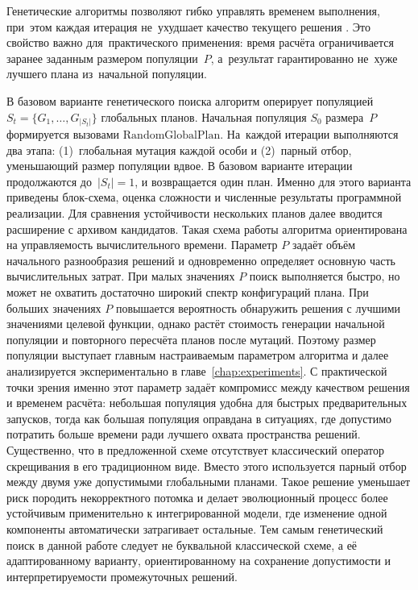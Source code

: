 Генетические алгоритмы позволяют гибко управлять временем выполнения, при~этом каждая итерация не~ухудшает качество текущего решения \cite{genetics_2,kureichik1998,goldberg1989genetic}.
Это свойство важно для~практического применения: время расчёта ограничивается заранее заданным размером популяции~$P$, а~результат гарантированно не~хуже лучшего плана из~начальной популяции.

В базовом варианте генетического поиска алгоритм оперирует популяцией $S_t=\{G_1,\ldots,G_{|S_t|}\}$ глобальных планов.
Начальная популяция $S_0$ размера~$P$ формируется вызовами $\mathrm{RandomGlobalPlan}$.
На~каждой итерации выполняются два этапа: (1)~глобальная мутация каждой особи и (2)~парный отбор, уменьшающий размер популяции вдвое.
В базовом варианте итерации продолжаются до~$|S_t|=1$, и возвращается один план. Именно для этого варианта приведены блок-схема, оценка сложности и численные результаты программной реализации. Для сравнения устойчивости нескольких планов далее вводится расширение с архивом кандидатов.
Такая схема работы алгоритма ориентирована на управляемость вычислительного времени. Параметр $P$ задаёт объём начального разнообразия решений и одновременно определяет основную часть вычислительных затрат. При малых значениях $P$ поиск выполняется быстро, но может не охватить достаточно широкий спектр конфигураций плана. При больших значениях $P$ повышается вероятность обнаружить решения с лучшими значениями целевой функции, однако растёт стоимость генерации начальной популяции и повторного пересчёта планов после мутаций. Поэтому размер популяции выступает главным настраиваемым параметром алгоритма и далее анализируется экспериментально в главе~\ref{chap:experiments}. С практической точки зрения именно этот параметр задаёт компромисс между качеством решения и временем расчёта: небольшая популяция удобна для быстрых предварительных запусков, тогда как большая популяция оправдана в ситуациях, где допустимо потратить больше времени ради лучшего охвата пространства решений.
Существенно, что в предложенной схеме отсутствует классический оператор скрещивания в его традиционном виде. Вместо этого используется парный отбор между двумя уже допустимыми глобальными планами. Такое решение уменьшает риск породить некорректного потомка и делает эволюционный процесс более устойчивым применительно к интегрированной модели, где изменение одной компоненты автоматически затрагивает остальные. Тем самым генетический поиск в данной работе следует не буквальной классической схеме, а её адаптированному варианту, ориентированному на сохранение допустимости и интерпретируемости промежуточных решений.

